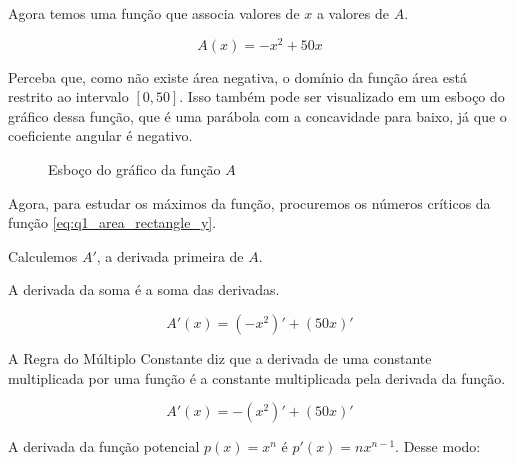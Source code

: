 \documentclass{article}
\begin{document}
Agora temos uma função que associa valores de \(x\) a valores de \(A\).

\begin{equation}\label{eq:q1_area_rectangle_y}
    A(x) = - x^2 + 50x
\end{equation}

Perceba que, como não existe área negativa, o domínio da função área
está restrito ao intervalo \([0,50]\). Isso também pode ser visualizado
em um esboço do gráfico dessa função, que é uma parábola com a concavidade para baixo, já que o coeficiente angular é
negativo.

\begin{figure}[H]
    \centering
    \caption{Esboço do gráfico da função \(A\)}
\end{figure}


Agora, para estudar os máximos da função, procuremos os números críticos
da função \ref{eq:q1_area_rectangle_y}.

Calculemos \(A'\), a derivada primeira de \(A\).

A derivada da soma é a soma das derivadas.

\[
    A'(x) = (-x^2)' + (50x)'
\]

A Regra do Múltiplo Constante diz que a derivada de uma constante multiplicada
por uma função é a constante multiplicada pela derivada da função.

\[
    A'(x) = -(x^2)' + (50x)'
\]

A derivada da função potencial \(p(x) = x^n\) é  \(p'(x) = nx^{n-1}\). Desse modo:
\end{document}
